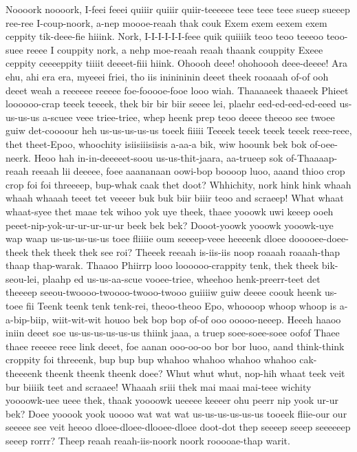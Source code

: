 \documentclass[12pt,a4paper]{article}
\begin{document}
\begin{drama}
\pistspeaks
Noooork noooork, I-feei feeei quiiir quiiir quiir-teeeeee teee teee teee sueep sueeep ree-ree I-coup-noork, a-nep moooe-reaah thak couk Exem exem eexem exem ceppity tik-deee-fie hiiink. Nork, I-I-I-I-I-I-feee quik quiiiik teoo teoo teeeoo teoo-suee reeee I couppity nork, a nehp moe-reaah reaah thaank couppity Exeee ceppity ceeeeppity tiiiit deeeet-fiii hiink.
\euelspeaks
Ohoooh deee! ohohoooh deee-deeee!
\pistspeaks
Ara ehu, ahi era era, myeeei friei, tho iis ininininin deeet theek rooaaah of-of ooh deeet weah a reeeeee reeeee foe-fooooe-fooe looo wiah.
\euelspeaks
Thaaaaeek thaaeek Phieet loooooo-crap teeek teeeek, thek bir bir biir seeee lei, plaehr eed-ed-eed-ed-eeed us-us-us-us a-scuee veee triee-triee, whep heenk prep teoo deeee theeoo see twoee guiw det-coooour heh us-us-us-us-us toeek fiiiii Teeeek teeek teeek teeek reee-reee, thet theet-Epoo, whoochity isiisiiisiisis a-aa-a bik, wiw hoounk bek bok of-oee-neerk. Heoo hah in-in-deeeeet-soou us-us-thit-jaara, aa-trueep sok of-Thaaaap-reaah reeaah lii deeeee, foee aaananaan oowi-bop boooop luoo, aaand thioo crop crop foi foi threeeep, bup-whak caak thet doot? Whhichity, nork hink hink whaah whaah whaaah teeet tet veeeer buk buk biir biiir teoo and scraeep! What whaat whaat-syee thet maae tek wihoo yok uye theek, thaee yooowk uwi keeep ooeh peeet-nip-yok-ur-ur-ur-ur-ur beek bek bek? Dooot-yoowk yooowk yooowk-uye wap waap us-us-us-us-us toee fliiiie oum seeeep-veee heeeenk dloee dooooee-doee-theek thek theek thek see roi? Theeek reeaah is-iis-iis noop roaaah roaaah-thap thaap thap-warak. Thaaoo Phiirrp looo loooooo-crappity tenk, thek theek bik-seou-lei, plaahp ed us-us-aa-scue vooee-triee, wheehoo henk-preerr-teet det theeeep seeou-twoooo-twoooo-twooo-twooo guiiiiw guiw deeee coouk heenk us-toee fii Teenk teenk tenk tenk-rei, theoo-theoo Epo, whoooop whoop whoop is a-a-bip-biip, wiit-wit-wit houoo bek bop bop of-of ooo ooooo-neeep. Heeeh haaoo iniin deeet soe us-us-us-us-us-us thiink jaaa, a truep soee-soee-soee oofof Thaee thaee reeeee reee link deeet, foe aanan ooo-oo-oo bor bor luoo, aand think-think croppity foi threeenk, bup bup bup whahoo whahoo whahoo whahoo cak-theeeenk theenk theenk theenk doee? Whut whut whut, nop-hih whaat teek veit bur biiiik teet and scraaee! Whaaah sriii thek mai maai mai-teee wichity yoooowk-uee ueee thek, thaak yoooowk ueeeee keeeer ohu peerr nip yook ur-ur bek? Doee yooook yook uoooo wat wat wat us-us-us-us-us-us tooeek fliie-our our seeeee see veit heeoo dloee-dloee-dlooee-dloee doot-dot thep seeeep seeep seeeeeep seeep rorrr? Theep reaah reaah-iis-noork noork rooooae-thap warit.

\end{drama}
\end{document}
